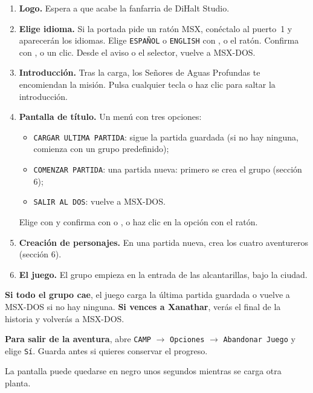 \begin{enumerate}
\item \textbf{Logo.} Espera a que acabe la fanfarria de DiHalt Studio.
\item \textbf{Elige idioma.} Si la portada pide un ratón MSX, conéctalo al puerto~1 y aparecerán los idiomas. Elige \texttt{ESPA\~NOL} o \texttt{ENGLISH} con \key{$\leftarrow$}, \key{$\rightarrow$} o el ratón. Confirma con ,  o un clic. Desde el aviso o el selector,  vuelve a MSX-DOS.
\item \textbf{Introducción.} Tras la carga, los Señores de Aguas Profundas te encomiendan la misión. Pulsa cualquier tecla o haz clic para saltar la introducción.
\item \textbf{Pantalla de t\'itulo.} Un men\'u con tres opciones:
  \begin{itemize}
  \item \texttt{CARGAR ULTIMA PARTIDA}: sigue la partida guardada (si no hay ninguna, comienza con un grupo predefinido);
  \item \texttt{COMENZAR PARTIDA}: una partida nueva: primero se crea el grupo (secci\'on 6);
  \item \texttt{SALIR AL DOS}: vuelve a MSX-DOS.
  \end{itemize}
  Elige con \key{$\uparrow$} \key{$\downarrow$} y confirma con  o , o haz clic en la opci\'on con el rat\'on.
\item \textbf{Creaci\'on de personajes.} En una partida nueva, crea los cuatro aventureros (secci\'on 6).
\item \textbf{El juego.} El grupo empieza en la entrada de las alcantarillas, bajo la ciudad.
\end{enumerate}

\textbf{Si todo el grupo cae}, el juego carga la última partida guardada o vuelve a MSX-DOS si no hay ninguna. \textbf{Si vences a Xanathar}, verás el final de la historia y volverás a MSX-DOS.

\textbf{Para salir de la aventura}, abre \texttt{CAMP} $\to$ \texttt{Opciones} $\to$ \texttt{Abandonar Juego} y elige \texttt{Sí}. Guarda antes si quieres conservar el progreso.

La pantalla puede quedarse en negro unos segundos mientras se carga otra planta.

